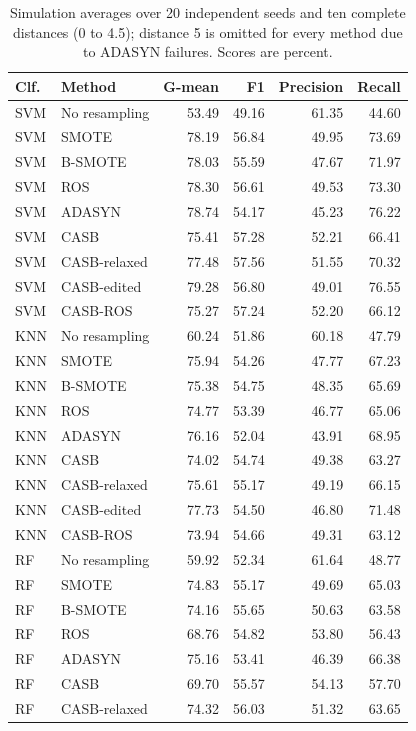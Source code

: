 \begin{table}[pos=!htbp]
\centering\small
\caption{Simulation averages over 20 independent seeds and ten complete distances (0 to 4.5); distance 5 is omitted for every method due to ADASYN failures. Scores are percent.}\label{tab:overlap}
\begin{tabular}{llrrrr}\toprule
Clf. & Method & G-mean & F1 & Precision & Recall \\
\midrule
SVM & No resampling & 53.49 & 49.16 & 61.35 & 44.60 \\
SVM & SMOTE & 78.19 & 56.84 & 49.95 & 73.69 \\
SVM & B-SMOTE & 78.03 & 55.59 & 47.67 & 71.97 \\
SVM & ROS & 78.30 & 56.61 & 49.53 & 73.30 \\
SVM & ADASYN & 78.74 & 54.17 & 45.23 & 76.22 \\
SVM & CASB & 75.41 & 57.28 & 52.21 & 66.41 \\
SVM & CASB-relaxed & 77.48 & 57.56 & 51.55 & 70.32 \\
SVM & CASB-edited & 79.28 & 56.80 & 49.01 & 76.55 \\
SVM & CASB-ROS & 75.27 & 57.24 & 52.20 & 66.12 \\
KNN & No resampling & 60.24 & 51.86 & 60.18 & 47.79 \\
KNN & SMOTE & 75.94 & 54.26 & 47.77 & 67.23 \\
KNN & B-SMOTE & 75.38 & 54.75 & 48.35 & 65.69 \\
KNN & ROS & 74.77 & 53.39 & 46.77 & 65.06 \\
KNN & ADASYN & 76.16 & 52.04 & 43.91 & 68.95 \\
KNN & CASB & 74.02 & 54.74 & 49.38 & 63.27 \\
KNN & CASB-relaxed & 75.61 & 55.17 & 49.19 & 66.15 \\
KNN & CASB-edited & 77.73 & 54.50 & 46.80 & 71.48 \\
KNN & CASB-ROS & 73.94 & 54.66 & 49.31 & 63.12 \\
RF & No resampling & 59.92 & 52.34 & 61.64 & 48.77 \\
RF & SMOTE & 74.83 & 55.17 & 49.69 & 65.03 \\
RF & B-SMOTE & 74.16 & 55.65 & 50.63 & 63.58 \\
RF & ROS & 68.76 & 54.82 & 53.80 & 56.43 \\
RF & ADASYN & 75.16 & 53.41 & 46.39 & 66.38 \\
RF & CASB & 69.70 & 55.57 & 54.13 & 57.70 \\
RF & CASB-relaxed & 74.32 & 56.03 & 51.32 & 63.65 \\

\end{tabular}
\end{table}
